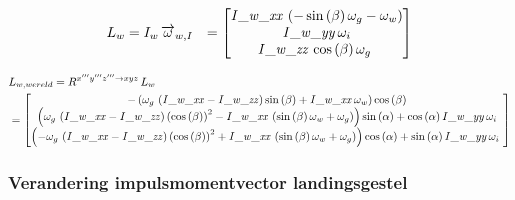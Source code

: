 \begin{equation*}
\begin{split}
L_{w}&=I_{w}\,\overrightarrow{\omega}_{w,I}&=
\begin{bmatrix}
{\it I\_w\_xx}\, \left( -\sin \left( \beta
 \right) \omega_{g}-\omega_{w} \right) \\
{\it 
I\_w\_yy}\,\omega_{i}\\
{\it I\_w\_zz}\,\cos \left( 
\beta \right) \omega_{g}\
\end{bmatrix}
\end{split}
\end{equation*}

\begin{align*}
&L_{w,wereld}=R^{x'''y'''z''' \rightarrow xyz}\,L_{w}\\
&=\begin{bmatrix}
- \left( \omega_{g}\, \left( {\it I\_w\_xx}-
{\it I\_w\_zz} \right) \sin \left( \beta \right) +{\it I\_w\_xx}\,
\omega_{w} \right) \cos \left( \beta \right) \\ 
%
 \left( \omega_{g}\, \left( {\it I\_w\_xx}-{\it I\_w\_zz} \right) 
 \left( \cos \left( \beta \right)  \right) ^{2}-{\it I\_w\_xx}\,
 \left( \sin \left( \beta \right) \omega_{w}+\omega_{g} \right) 
 \right) \sin \left( \alpha \right) +\cos \left( \alpha \right) {\it 
I\_w\_yy}\,\omega_{i}\\ 
%
 \left( -\omega_{g}\,
 \left( {\it I\_w\_xx}-{\it I\_w\_zz} \right)  \left( \cos \left( 
\beta \right)  \right) ^{2}+{\it I\_w\_xx}\, \left( \sin \left( \beta
 \right) \omega_{w}+\omega_{g} \right)  \right) \cos \left( \alpha
 \right) +\sin \left( \alpha \right) {\it I\_w\_yy}\,\omega_{i}
\
\end{bmatrix}
\end{align*}

\subsubsection{Verandering impulsmomentvector landingsgestel}

